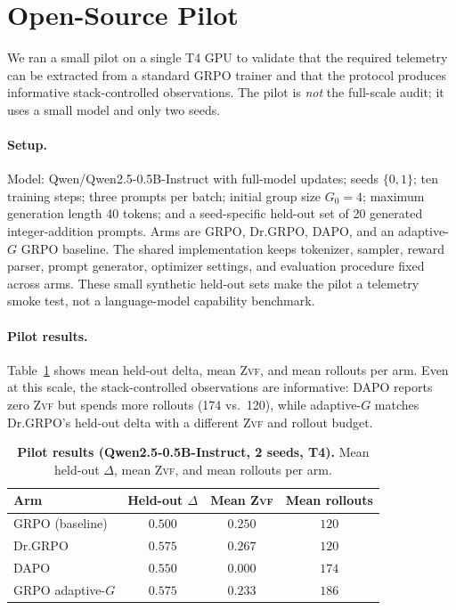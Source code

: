 \documentclass[11pt]{article}
\newcommand{\zvf}{\textsc{Zvf}}
\newcommand{\grpo}{\textsc{GRPO}}
\begin{document}
\section{Open-Source Pilot}
\label{sec:pilot}

We ran a small pilot on a single T4 GPU to validate that the required telemetry
can be extracted from a standard GRPO trainer and that the protocol produces
informative stack-controlled observations. The pilot is \emph{not} the
full-scale audit; it uses a small model and only two seeds.

\paragraph{Setup.} Model: Qwen/Qwen2.5-0.5B-Instruct with full-model updates;
seeds $\{0,1\}$; ten training steps; three prompts per batch; initial group size
$G_0=4$; maximum generation length 40 tokens; and a seed-specific held-out set
of 20 generated integer-addition prompts. Arms are GRPO, Dr.\grpo{}, DAPO, and
an adaptive-$G$ GRPO baseline. The shared implementation keeps tokenizer,
sampler, reward parser, prompt generator, optimizer settings, and evaluation
procedure fixed across arms. These small synthetic held-out sets make the
pilot a telemetry smoke test, not a language-model capability benchmark.

\paragraph{Pilot results.} Table~\ref{tab:pilot} shows mean held-out delta,
mean \zvf{}, and mean rollouts per arm. Even at this scale, the stack-controlled
observations are informative: DAPO reports zero \zvf{} but spends more rollouts
(174 vs.\ 120), while adaptive-$G$ matches Dr.\grpo{}'s held-out delta with a
different \zvf{} and rollout budget.

\begin{table}[t]
\centering
\caption{\textbf{Pilot results (Qwen2.5-0.5B-Instruct, 2 seeds, T4).} Mean
  held-out $\Delta$, mean \zvf{}, and mean rollouts per arm.}
\label{tab:pilot}
\small
\begin{tabular}{@{}lccc@{}}
\toprule
\textbf{Arm} & \textbf{Held-out $\Delta$} & \textbf{Mean \zvf{}} &
\textbf{Mean rollouts}\\
\midrule
GRPO (baseline)          & $0.500$ & $0.250$ & $120$ \\
Dr.\grpo{}                & $0.575$ & $0.267$ & $120$ \\
DAPO                     & $0.550$ & $0.000$ & $174$ \\
GRPO adaptive-$G$        & $0.575$ & $0.233$ & $186$ \\
\bottomrule
\end{tabular}
\end{table}
\end{document}
